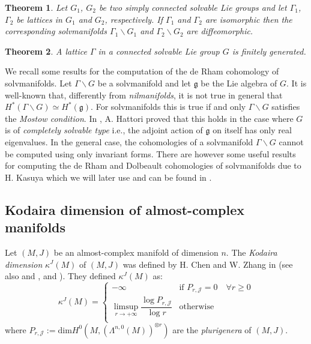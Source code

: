 \documentclass[a4paper, 11pt]{amsart}
\theoremstyle{plain}
\newtheorem{teorema}{Theorem} [section]
\theoremstyle{definition}
\numberwithin{equation}{section}
\begin{document}
{\begin{teorema}\label{MostowFundGroups}
    Let $G_{1}$, $G_{2}$ be two simply connected solvable Lie groups and let $\Gamma_{1}$, $\Gamma_{2}$ be lattices in $G_{1}$ and $G_{2}$, respectively. If $\Gamma_{1}$ and $\Gamma_{2}$ are isomorphic then the corresponding solvmanifolds $\Gamma_{1} \backslash G_{1}$ and $\Gamma_{2} \backslash G_{2}$ are diffeomorphic.
\end{teorema}
\begin{teorema}
    A lattice $\Gamma$ in a connected solvable Lie group $G$ is finitely generated.
\end{teorema}
We recall some results for the computation of the de Rham cohomology of solvmanifolds. Let $\Gamma \backslash G$ be a solvmanifold and let $\mathfrak{g}$ be the Lie algebra of $G$. It is well-known that, differently from \textit{nilmanifolds}, it is not true in general that $H^{*}(\Gamma \backslash G) \simeq H^{*}(\mathfrak{g})$. For solvmanifolds this is true if and only $\Gamma \backslash G$ satisfies the \textit{Mostow condition}. In \cite{Hattori}, A. Hattori proved that this holds in the case where $G$ is of \textit{completely solvable type} i.e., the adjoint action of $\mathfrak{g}$ on itself has only real eigenvalues. In the general case, the cohomologies of a solvmanifold $\Gamma \backslash G$ cannot be computed using only invariant forms. There are however some useful results for computing the de Rham and Dolbeault cohomologies of solvmanifolds due to H. Kasuya which we will later use and can be found in \cite{Kasuya}.

\subsection{Kodaira dimension of almost-complex manifolds} Let $(M, J)$ be an almost-complex manifold of dimension $n$. The \textit{Kodaira dimension} $\kappa^{J}(M)$ of $(M, J)$ was defined by H. Chen and W. Zhang in \cite{CZ} (see also \cite{CZ1} and \cite{CNT}, \cite{CNT1} and \cite{CNT2}). They defined $\kappa^{J}(M)$ as:
\[\kappa^{J}(M) = \begin{cases}
    - \infty & \text{if } P_{r, \mathcal{J}} = 0 \quad \forall r \ge 0 \\
    \limsup_{r \rightarrow +\infty}\dfrac{\log P_{r,\mathcal{J}}}{\log r} & \text{otherwise }\\
\end{cases}\]
where $P_{r, \mathcal{J}} := \text{dim}H^{0}(M, (\Lambda^{n,0}(M))^{\otimes r})$ are the \textit{plurigenera} of $(M, J)$.

}
\end{document}
